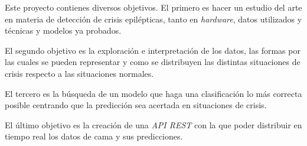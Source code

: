 
Este proyecto contienes diversos objetivos. El primero es hacer un estudio del arte en materia de detección de crisis epilépticas, tanto en \textit{hardware}, datos utilizados y técnicas y modelos ya probados.

El segundo objetivo es la exploración e interpretación de los datos, las formas por las cuales se pueden representar y como se distribuyen las distintas situaciones de crisis respecto a las situaciones normales.

El tercero es la búsqueda de un modelo que haga una clasificación lo más correcta posible centrando que la predicción sea acertada en situaciones de crisis.

El último objetivo es la creación de una \textit{API REST} con la que poder distribuir en tiempo real los datos de cama y sus predicciones.
